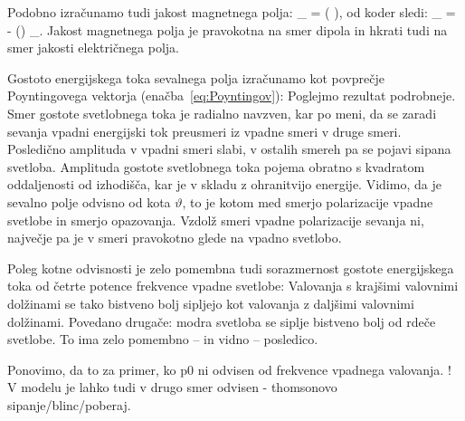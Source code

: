Podobno izračunamo tudi jakost magnetnega polja:
\beq
{}_ = 
\left( \times {}\right)\!\!,
\label{eq:07_13}
\eeq
od koder sledi: 
\beq
{}_ = - \sin \vartheta
\left(\right) _\varphi.
\label{eq:dipolH}
\eeq
Jakost magnetnega polja je pravokotna na smer dipola in hkrati tudi na smer
jakosti električnega polja. 

Gostoto energijskega toka sevalnega polja izračunamo kot povprečje 
Poyntingovega vektorja (enačba~\ref{eq:Poyntingov}):
Poglejmo rezultat podrobneje. Smer gostote svetlobnega toka je radialno navzven, 
kar po meni, da se zaradi sevanja vpadni energijski tok preusmeri iz vpadne smeri
v druge smeri. Posledično amplituda v vpadni smeri slabi, v ostalih smereh pa se 
pojavi sipana svetloba. Amplituda gostote svetlobnega toka 
pojema obratno s kvadratom oddaljenosti od izhodišča, kar je v skladu
z ohranitvijo energije. Vidimo, da je sevalno polje odvisno od kota $\vartheta$,
to je kotom med smerjo polarizacije vpadne svetlobe in smerjo opazovanja. Vzdolž
smeri vpadne polarizacije sevanja ni, največje pa je v smeri pravokotno glede
na vpadno svetlobo.

Poleg kotne odvisnosti je zelo pomembna tudi sorazmernost gostote energijskega toka
od četrte potence frekvence vpadne svetlobe:
Valovanja s krajšimi valovnimi dolžinami se tako bistveno bolj sipljejo kot valovanja 
z daljšimi valovnimi dolžinami. Povedano drugače: modra svetloba se siplje bistveno 
bolj od rdeče svetlobe. To ima zelo pomembno -- in vidno -- posledico.

Ponovimo, da to za primer, ko p0 ni odvisen od frekvence vpadnega valovanja. ! V modelu je 
lahko tudi v drugo smer odvisen - thomsonovo sipanje/blinc/poberaj.


